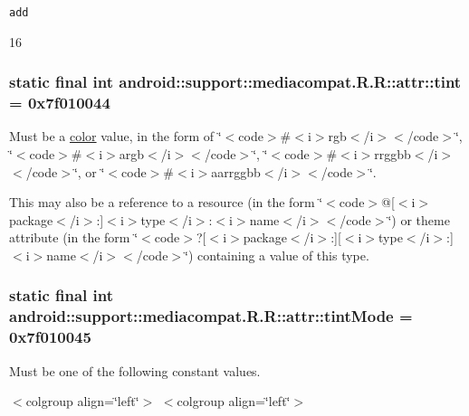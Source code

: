 {\tt add}

16\hypertarget{classandroid_1_1support_1_1mediacompat_1_1_r_1_1attr_70adee35c1e54a919a9b4a18aa99096c}{
\subsubsection[{tint}]{\setlength{\rightskip}{0pt plus 5cm}static final int android::support::mediacompat.R.R::attr::tint = 0x7f010044}}
\label{classandroid_1_1support_1_1mediacompat_1_1_r_1_1attr_70adee35c1e54a919a9b4a18aa99096c}


Must be a \hyperlink{classandroid_1_1support_1_1mediacompat_1_1_r_1_1color}{color} value, in the form of \char`\"{}$<$code$>$\#$<$i$>$rgb$<$/i$>$$<$/code$>$\char`\"{}, \char`\"{}$<$code$>$\#$<$i$>$argb$<$/i$>$$<$/code$>$\char`\"{}, \char`\"{}$<$code$>$\#$<$i$>$rrggbb$<$/i$>$$<$/code$>$\char`\"{}, or \char`\"{}$<$code$>$\#$<$i$>$aarrggbb$<$/i$>$$<$/code$>$\char`\"{}. 

This may also be a reference to a resource (in the form \char`\"{}$<$code$>$@\mbox{[}$<$i$>$package$<$/i$>$:\mbox{]}$<$i$>$type$<$/i$>$:$<$i$>$name$<$/i$>$$<$/code$>$\char`\"{}) or theme attribute (in the form \char`\"{}$<$code$>$?\mbox{[}$<$i$>$package$<$/i$>$:\mbox{]}\mbox{[}$<$i$>$type$<$/i$>$:\mbox{]}$<$i$>$name$<$/i$>$$<$/code$>$\char`\"{}) containing a value of this type. \hypertarget{classandroid_1_1support_1_1mediacompat_1_1_r_1_1attr_6928f14e9560b01ef8f791325b9d6907}{
\subsubsection[{tintMode}]{\setlength{\rightskip}{0pt plus 5cm}static final int android::support::mediacompat.R.R::attr::tintMode = 0x7f010045}}
\label{classandroid_1_1support_1_1mediacompat_1_1_r_1_1attr_6928f14e9560b01ef8f791325b9d6907}


Must be one of the following constant values. \begin{TabularC}{0}
\hline
\end{TabularC}
$<$colgroup align=\char`\"{}left\char`\"{}$>$ $<$colgroup align=\char`\"{}left\char`\"{}$>$ 


